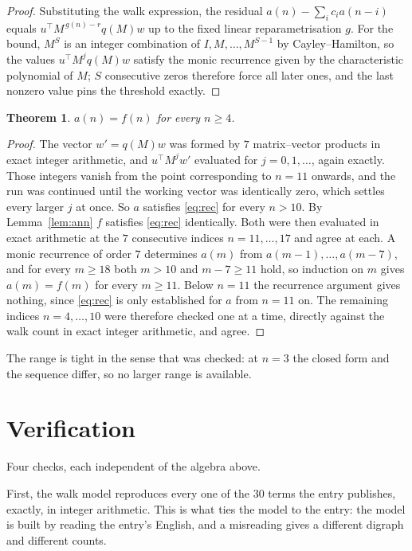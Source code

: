 \documentclass[11pt,a4paper]{article}
\theoremstyle{plain}
\newtheorem{theorem}{Theorem}
\theoremstyle{definition}
\begin{document}
\begin{proof}
Substituting the walk expression, the residual $a(n)-\sum_ic_ia(n-i)$ equals
$u^{\!\top}M^{\,g(n)-r}q(M)w$ up to the fixed linear reparametrisation $g$. For the bound,
$M^{S}$ is an integer combination of $I,M,\dots,M^{S-1}$ by Cayley--Hamilton, so the values
$u^{\!\top}M^{j}q(M)w$ satisfy the monic recurrence given by the characteristic polynomial of
$M$; $S$ consecutive zeros therefore force all later ones, and the last nonzero value pins the
threshold exactly.
\end{proof}

\begin{theorem}
$a(n)=f(n)$ for every $n\ge4$.
\end{theorem}

\begin{proof}
The vector $w'=q(M)w$ was formed by $7$ matrix--vector products in exact integer
arithmetic, and $u^{\!\top}M^{j}w'$ evaluated for $j=0,1,\dots$, again exactly. Those integers
vanish from the point corresponding to $n=11$ onwards, and the run was continued until the
working vector was identically zero, which settles every larger $j$ at once. So $a$ satisfies
\eqref{eq:rec} for every $n>10$. By Lemma~\ref{lem:ann} $f$ satisfies \eqref{eq:rec}
identically. Both were then evaluated in exact arithmetic at the $7$ consecutive indices
$n=11,\dots,17$ and agree at each. A monic recurrence of order $7$
determines $a(m)$ from $a(m-1),\dots,a(m-7)$, and for every $m\ge18$ both
$m>10$ and $m-7\ge11$ hold, so induction on $m$ gives $a(m)=f(m)$ for every
$m\ge11$.
Below $n=11$ the recurrence argument gives nothing, since \eqref{eq:rec} is only
established for $a$ from $n=11$ on. The remaining indices $n=4,\dots,10$ were
therefore checked one at a time, directly against the walk count in exact integer arithmetic,
and agree.
\end{proof}

The range is tight in the sense that was checked: at $n=3$ the closed form and the sequence differ, so no larger range is available.

\section{Verification}

Four checks, each independent of the algebra above.

First, the walk model reproduces every one of the $30$ terms the entry publishes,
exactly, in integer arithmetic. This is what ties the model to the entry: the model is built
by reading the entry's English, and a misreading gives a different digraph and different
counts.
\end{document}
